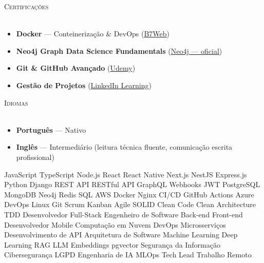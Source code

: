 \documentclass[a4paper]{article}
\newcommand{\lineunder}{
    \vspace*{-8pt} \\
    \hspace*{-18pt} \hrulefill \\
}
\newcommand{\header}[1]{
    {\hspace*{-18pt}\vspace*{6pt} \textsc{#1}}
    \vspace*{-6pt} \lineunder
}
\begin{document}
\header{Certificações}
\vspace{2mm}
\begin{itemize}[leftmargin=*, itemsep=-2pt]
    \item \textbf{Docker} — Conteinerização \& DevOps (\href{https://drive.google.com/drive/folders/1YKThgvnT5h1bA_Hb0uDiIf7p8Qiph-NC}{B7Web})
    \item \textbf{Neo4j Graph Data Science Fundamentals} (\href{https://graphacademy.neo4j.com/c/9d25b259-5995-4053-8475-7b2bf61f163e/}{Neo4j — oficial})
    \item \textbf{Git \& GitHub Avançado} (\href{https://www.udemy.com/certificate/UC-db57cce7-1471-47ff-9828-0e3a4d7da628/}{Udemy})
    \item \textbf{Gestão de Projetos} (\href{https://www.linkedin.com/learning/certificates/0fc1a744c87dc72f53e8c694fd58809808a183327167377cb224c1ac43e732b6}{LinkedIn Learning})
\end{itemize}

\vspace{3mm}

\header{Idiomas}
\vspace{2mm}
\begin{itemize}[leftmargin=*, itemsep=-2pt]
    \item \textbf{Português} — Nativo
    \item \textbf{Inglês} — Intermediário (leitura técnica fluente, comunicação escrita profissional)
\end{itemize}

\vspace{3mm}

{\tiny\color{white}
JavaScript TypeScript Node.js React React Native Next.js NestJS Express.js Python Django
REST API RESTful API GraphQL Webhooks JWT PostgreSQL MongoDB Neo4j Redis SQL
AWS Docker Nginx CI/CD GitHub Actions Azure DevOps Linux Git Scrum Kanban Agile
SOLID Clean Code Clean Architecture TDD Desenvolvedor Full-Stack Engenheiro de Software Back-end
Front-end Desenvolvedor Mobile Computação em Nuvem DevOps Microsserviços Desenvolvimento de API
Arquitetura de Software Machine Learning Deep Learning RAG LLM Embeddings pgvector
Segurança da Informação Cibersegurança LGPD Engenharia de IA MLOps Tech Lead Trabalho Remoto
}
\end{document}
